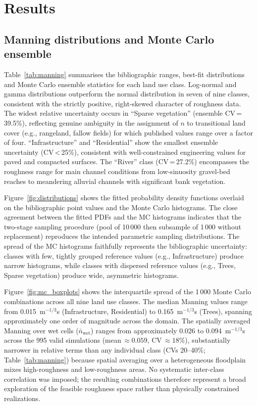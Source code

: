 \documentclass[review,12pt]{elsarticle}
\newcommand{\nman}{$n$}
\begin{document}
\section{Results}
\label{sec:results}

\subsection{Manning distributions and Monte Carlo ensemble}
\label{sec:mc_results}

Table~\ref{tab:manning} summarises the bibliographic ranges, best-fit
distributions and Monte Carlo ensemble statistics for each land use class.
Log-normal and gamma distributions outperform the normal distribution in
seven of nine classes, consistent with the strictly positive, right-skewed
character of roughness data.
The widest relative uncertainty occurs in ``Sparse vegetation'' (ensemble
CV\,=\,39.5\%), reflecting genuine ambiguity in the assignment of \nman{}
to transitional land cover (e.g., rangeland, fallow fields) for which
published values range over a factor of four.
``Infrastructure'' and ``Residential'' show the smallest ensemble uncertainty
(CV\,<\,25\%), consistent with well-constrained engineering values for
paved and compacted surfaces.
The ``River'' class (CV\,=\,27.2\%) encompasses the roughness range for main
channel conditions from low-sinuosity gravel-bed reaches to meandering
alluvial channels with significant bank vegetation.

Figure~\ref{fig:distributions} shows the fitted probability density functions
overlaid on the bibliographic point values and the Monte Carlo histograms.
The close agreement between the fitted PDFs and the MC histograms indicates
that the two-stage sampling procedure (pool of 10\,000 then subsample
of 1\,000 without replacement) reproduces the intended parametric
sampling distributions.
The spread of the MC histograms faithfully represents the bibliographic
uncertainty: classes with few, tightly grouped reference values
(e.g., Infrastructure) produce narrow histograms, while classes with
dispersed reference values (e.g., Trees, Sparse vegetation) produce
wide, asymmetric histograms.

Figure~\ref{fig:mc_boxplots} shows the interquartile spread of the
1\,000 Monte Carlo combinations across all nine land use classes.
The median Manning values range from 0.015~m$^{-1/3}$s (Infrastructure,
Residential) to 0.165~m$^{-1/3}$s (Trees), spanning approximately one
order of magnitude across the domain.
The spatially averaged Manning over wet cells ($\bar{n}_{\mathrm{wet}}$)
ranges from approximately 0.026 to 0.094~m$^{-1/3}$s across the 995 valid
simulations (mean\,$\approx 0.059$, CV\,$\approx 18$\%), substantially narrower
in relative terms than any individual class (CVs 20--40\%; Table~\ref{tab:manning})
because spatial averaging over a heterogeneous floodplain mixes high-roughness
and low-roughness areas.
No systematic inter-class correlation was imposed; the resulting combinations
therefore represent a broad exploration of the feasible roughness space rather
than physically constrained realizations.
\end{document}
